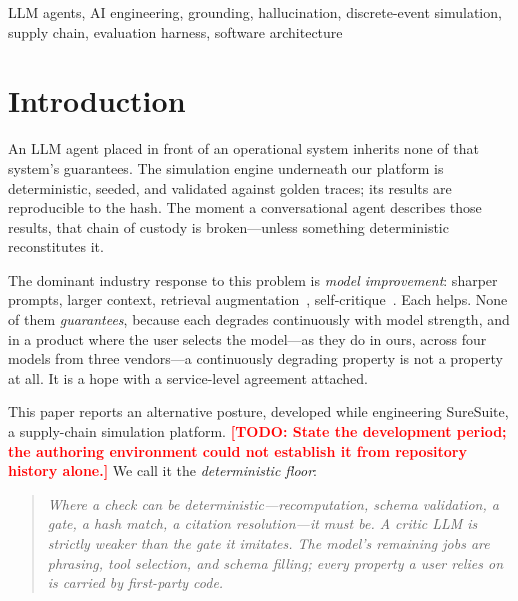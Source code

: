 \documentclass[conference]{IEEEtran}
\newcommand{\TODO}[1]{\textcolor{red}{\textbf{[TODO: #1]}}}
\begin{document}
\begin{abstract}
Our central empirical result is a capability-coverage audit on a real
operational network (60 suppliers, 560 materials): after the harness landed, all
twelve probed intent families answer from grounded artifacts, with zero gaps,
and every new tool's output matches independently recomputed ground truth. We
argue the resulting architecture is portable: the pattern is to identify the
seams where a check \emph{can} be deterministic and to insist that at those seams
it \emph{must} be.
\end{abstract}

\begin{IEEEkeywords}
LLM agents, AI engineering, grounding, hallucination, discrete-event simulation,
supply chain, evaluation harness, software architecture
\end{IEEEkeywords}

\section{Introduction}

An LLM agent placed in front of an operational system inherits none of that
system's guarantees. The simulation engine underneath our platform is
deterministic, seeded, and validated against golden traces; its results are
reproducible to the hash. The moment a conversational agent describes those
results, that chain of custody is broken---unless something deterministic
reconstitutes it.

The dominant industry response to this problem is \emph{model improvement}:
sharper prompts, larger context, retrieval augmentation~\cite{lewis2020rag},
self-critique~\cite{shinn2023reflexion}. Each helps. None of them
\emph{guarantees}, because each degrades continuously with model strength, and in
a product where the user selects the model---as they do in ours, across four
models from three vendors---a continuously degrading property is not a property
at all. It is a hope with a service-level agreement attached.

This paper reports an alternative posture, developed while engineering
SureSuite, a supply-chain simulation platform. \TODO{State the development
period; the authoring environment could not establish it from repository history
alone.} We call it the \emph{deterministic floor}:

\begin{quote}
\itshape
Where a check \emph{can} be deterministic---recomputation, schema validation, a
gate, a hash match, a citation resolution---it \emph{must} be. A critic LLM is
strictly weaker than the gate it imitates. The model's remaining jobs are
phrasing, tool selection, and schema filling; every property a user relies on is
carried by first-party code.
\end{quote}
\end{document}

